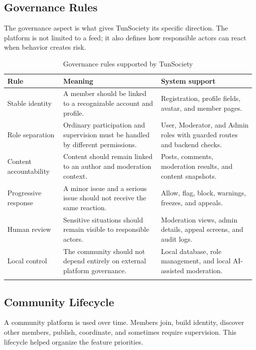 \subsection*{Governance Rules}

The governance aspect is what gives TunSociety its specific direction. The platform is not limited to a feed; it also defines how responsible actors can react when behavior creates risk.

\begin{longtable}{|m{3.4cm}|m{5.1cm}|m{5.3cm}|}
\hline
\textbf{Rule} & \textbf{Meaning} & \textbf{System support} \\
\hline
Stable identity & A member should be linked to a recognizable account and profile. & Registration, profile fields, avatar, and member pages. \\
\hline
Role separation & Ordinary participation and supervision must be handled by different permissions. & User, Moderator, and Admin roles with guarded routes and backend checks. \\
\hline
Content accountability & Content should remain linked to an author and moderation context. & Posts, comments, moderation results, and content snapshots. \\
\hline
Progressive response & A minor issue and a serious issue should not receive the same reaction. & Allow, flag, block, warnings, freezes, and appeals. \\
\hline
Human review & Sensitive situations should remain visible to responsible actors. & Moderation views, admin details, appeal screens, and audit logs. \\
\hline
Local control & The community should not depend entirely on external platform governance. & Local database, role management, and local AI-assisted moderation. \\
\hline
\caption{Governance rules supported by TunSociety}
\end{longtable}

\subsection*{Community Lifecycle}

A community platform is used over time. Members join, build identity, discover other members, publish, coordinate, and sometimes require supervision. This lifecycle helped organize the feature priorities.


